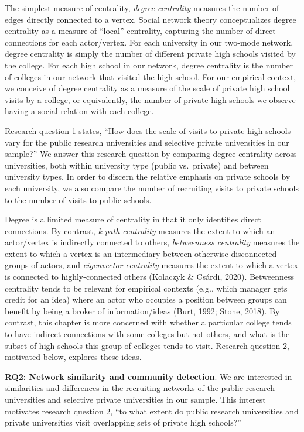 \documentclass[
  12pt,
]{article}
\begin{document}
The simplest measure of centrality, \emph{degree centrality} measures the number of edges directly connected to a vertex. Social network theory conceptualizes degree centrality as a measure of ``local'' centrality, capturing the number of direct connections for each actor/vertex. For each university in our two-mode network, degree centrality is simply the number of different private high schools visited by the college. For each high school in our network, degree centrality is the number of colleges in our network that visited the high school. For our empirical context, we conceive of degree centrality as a measure of the scale of private high school visits by a college, or equivalently, the number of private high schools we observe having a social relation with each college.

Research question 1 states, ``How does the scale of visits to private high schools vary for the public research universities and selective private universities in our sample?'' We answer this research question by comparing degree centrality across universities, both within university type (public vs.~private) and between university types. In order to discern the relative emphasis on private schools by each university, we also compare the number of recruiting visits to private schools to the number of visits to public schools.

Degree is a limited measure of centrality in that it only identifies direct connections. By contrast, \emph{k-path centrality} measures the extent to which an actor/vertex is indirectly connected to others, \emph{betweenness centrality} measures the extent to which a vertex is an intermediary between otherwise disconnected groups of actors, and \emph{eigenvector centrality} measures the extent to which a vertex is connected to highly-connected others (Kolaczyk \& Csárdi, 2020). Betweenness centrality tends to be relevant for empirical contexts (e.g., which manager gets credit for an idea) where an actor who occupies a position between groups can benefit by being a broker of information/ideas (Burt, 1992; Stone, 2018). By contrast, this chapter is more concerned with whether a particular college tends to have indirect connections with some colleges but not others, and what is the subset of high schools this group of colleges tends to visit. Research question 2, motivated below, explores these ideas.

\textbf{RQ2: Network similarity and community detection}. We are interested in similarities and differences in the recruiting networks of the public research universities and selective private universities in our sample. This interest motivates research question 2, ``to what extent do public research universities and private universities visit overlapping sets of private high schools?''
\end{document}

